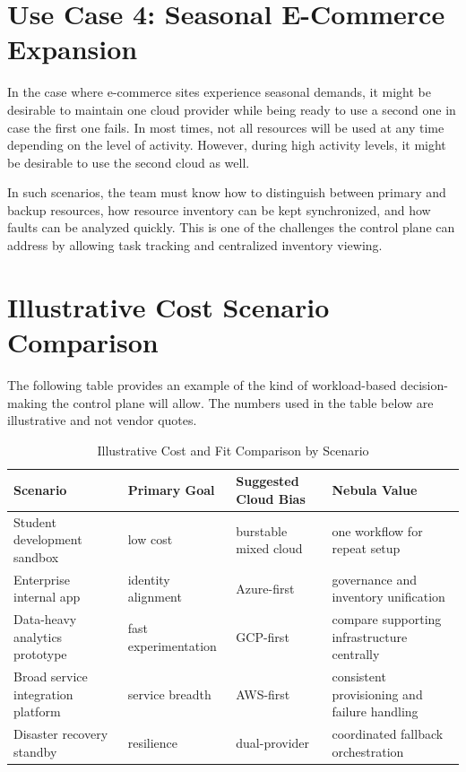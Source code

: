 \section{Use Case 4: Seasonal E-Commerce Expansion}


In the case where e-commerce sites experience seasonal demands, it might be desirable to maintain one cloud provider while being ready to use a second one in case the first one fails. In most times, not all resources will be used at any time depending on the level of activity. However, during high activity levels, it might be desirable to use the second cloud as well.


In such scenarios, the team must know how to distinguish between primary and backup resources, how resource inventory can be kept synchronized, and how faults can be analyzed quickly. This is one of the challenges the control plane can address by allowing task tracking and centralized inventory viewing.

\section{Illustrative Cost Scenario Comparison}
The following table provides an example of the kind of workload-based decision-making the control plane will allow. The numbers used in the table below are illustrative and not vendor quotes.

\begin{table}
\centering
\caption{Illustrative Cost and Fit Comparison by Scenario}
\label{tab:cost_scenario}
\begin{tabular}{|p{4.0cm}|p{2.0cm}|p{2.0cm}|p{3.0cm}|}
\hline
\textbf{Scenario} & \textbf{Primary Goal} & \textbf{Suggested Cloud Bias} & \textbf{Nebula Value} \\ \hline
Student development sandbox & low cost & burstable mixed cloud & one workflow for repeat setup \\ \hline
Enterprise internal app & identity alignment & Azure-first & governance and inventory unification \\ \hline
Data-heavy analytics prototype & fast experimentation & GCP-first & compare supporting infrastructure centrally \\ \hline
Broad service integration platform & service breadth & AWS-first & consistent provisioning and failure handling \\ \hline
Disaster recovery standby & resilience & dual-provider & coordinated fallback orchestration \\ \hline
\end{tabular}
\end{table}

